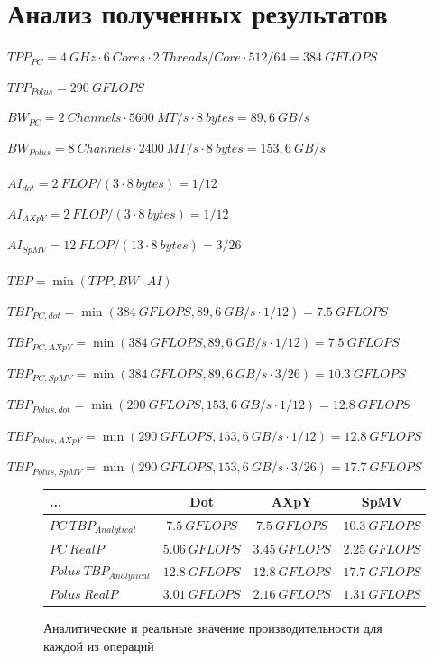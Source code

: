 \documentclass[12pt, a4paper]{article}
\begin{document}
\newpage

\section{Анализ полученных результатов}

$ TPP_{PC} = 4\ GHz \cdot 6\ Cores \cdot 2\ Threads/Core \cdot 512/64 = 384\ GFLOPS $ 

$ TPP_{Polus} = 290\ GFLOPS $

$ BW_{PC} = 2\ Channels \cdot 5600\ MT/s \cdot 8\ bytes = 89,6\ GB/s $

$ BW_{Polus} = 8\ Channels \cdot 2400\ MT/s \cdot 8\ bytes = 153,6\ GB/s $ \\ \\

$ AI_{dot} = 2\ FLOP / (3 \cdot 8\ bytes) = 1/12 $

$ AI_{AXpY} = 2\ FLOP / (3 \cdot 8\ bytes) = 1/12 $

$ AI_{SpMV} = 12\ FLOP / (13 \cdot 8\ bytes) = 3/26 $ \\ \\

$ TBP = \min(TPP, BW \cdot AI)  $

$ TBP_{PC, dot} = \min(384\ GFLOPS, 89,6\ GB/s \cdot 1/12) = 7.5\ GFLOPS $

$ TBP_{PC, AXpY} = \min(384\ GFLOPS, 89,6\ GB/s \cdot 1/12) = 7.5\ GFLOPS $

$ TBP_{PC, SpMV} = \min(384\ GFLOPS, 89,6\ GB/s \cdot 3/26) = 10.3\ GFLOPS $

$ TBP_{Polus, dot} = \min(290\ GFLOPS, 153,6\ GB/s \cdot 1/12) = 12.8\ GFLOPS $

$ TBP_{Polus, AXpY} = \min(290\ GFLOPS, 153,6\ GB/s \cdot 1/12) = 12.8\ GFLOPS $

$ TBP_{Polus, SpMV} = \min(290\ GFLOPS, 153,6\ GB/s \cdot 3/26) = 17.7\ GFLOPS $

\begin{figure}[h!]
	\center
	\setlength{\tabcolsep}{10pt}
	\renewcommand{\arraystretch}{1.5}
	\begin{tabular}{|l|c|c|c|}
		\hline
		... & Dot & AXpY & SpMV \\
		\hline
		$PC\ TBP_{Analytical} $ & $ 7.5\ GFLOPS $ & $ 7.5\ GFLOPS $ & $ 10.3\ GFLOPS $ \\
		\hline
		$PC\ RealP $ & $ 5.06\ GFLOPS $ & $ 3.45\ GFLOPS $ & $ 2.25\ GFLOPS $ \\
		\hline
		$ Polus\ TBP_{Analytical} $& $ 12.8\ GFLOPS $ & $ 12.8\ GFLOPS $ & $ 17.7\ GFLOPS $ \\
		\hline
		$ Polus\ RealP $ & $ 3.01\ GFLOPS $ & $ 2.16\ GFLOPS $ & $ 1.31\ GFLOPS $ \\
		\hline
	\end{tabular}
	\caption{Аналитические и реальные значение производительности для каждой из операций}
	\label{fig:tbps}
\end{figure}
\end{document}
